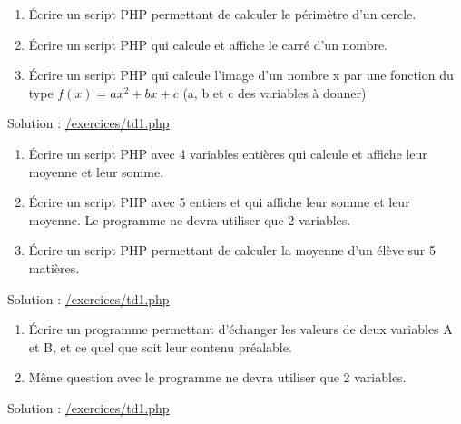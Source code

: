 \documentclass[10pt,a4paper,notitlepage]{article}
\begin{document}
	
	\begin{definition}
		\hspace{2ex} 
		\begin{enumerate}
			\item Écrire un script PHP permettant de calculer le périmètre d’un cercle.
			\item Écrire un script PHP qui calcule et affiche le carré d'un nombre.
			\item Écrire un script PHP qui calcule l’image d’un nombre x par une fonction du type
			$f(x) = ax^2+ bx + c$ (a, b et c des variables à donner)
		\end{enumerate}
		Solution : \href{https://exercicesdephp.000webhostapp.com/exercices/td1.php}{\color{blue} /exercices/td1.php}
	\end{definition}
	
	
	
	\begin{definition}
		\hspace{2ex} 
		\begin{enumerate}
			\item Écrire un script PHP avec 4 variables entières qui calcule et affiche leur moyenne et leur somme.
			\item Écrire un script PHP avec 5 entiers et qui affiche leur somme et leur moyenne. Le programme ne devra utiliser que 2 variables.
			\item Écrire un script PHP permettant de calculer la moyenne d’un élève sur 5 matières.
		\end{enumerate}
		Solution : \href{https://exercicesdephp.000webhostapp.com/exercices/td1.php}{\color{blue} /exercices/td1.php}
	\end{definition}
	\begin{definition}
		\hspace{2ex} 
		\begin{enumerate}
			\item Écrire un programme permettant d’échanger les valeurs de deux variables A et B, et ce quel que soit leur contenu préalable.
			\item Même question avec le programme ne devra utiliser que 2 variables.
		\end{enumerate}
		Solution : \href{https://exercicesdephp.000webhostapp.com/exercices/td1.php}{\color{blue} /exercices/td1.php}
	\end{definition}
	
	
\end{document}
